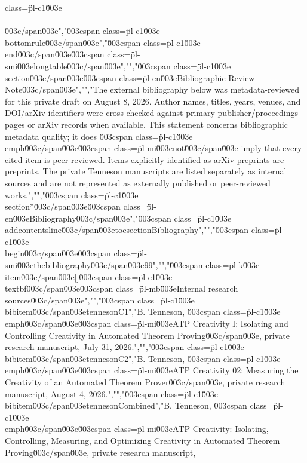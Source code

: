 {{{class=\"pl-c1\"\u003e\\\\\u003c/span\u003e","\u003cspan class=\"pl-c1\"\u003e\\bottomrule\u003c/span\u003e","\u003cspan class=\"pl-c1\"\u003e\\end\u003c/span\u003e{\u003cspan class=\"pl-smi\"\u003elongtable\u003c/span\u003e}","","\u003cspan class=\"pl-c1\"\u003e\\section\u003c/span\u003e{\u003cspan class=\"pl-en\"\u003eBibliographic Review Note\u003c/span\u003e}","","The external bibliography below was metadata-reviewed for this private draft on August 8, 2026. Author names, titles, years, venues, and DOI/arXiv identifiers were cross-checked against primary publisher/proceedings pages or arXiv records when available. This statement concerns bibliographic metadata quality; it does \u003cspan class=\"pl-c1\"\u003e\\emph\u003c/span\u003e{\u003cspan class=\"pl-mi\"\u003enot\u003c/span\u003e} imply that every cited item is peer-reviewed. Items explicitly identified as arXiv preprints are preprints. The private Tenneson manuscripts are listed separately as internal sources and are not represented as externally published or peer-reviewed works.","","\u003cspan class=\"pl-c1\"\u003e\\section*\u003c/span\u003e{\u003cspan class=\"pl-en\"\u003eBibliography\u003c/span\u003e}","\u003cspan class=\"pl-c1\"\u003e\\addcontentsline\u003c/span\u003e{toc}{section}{Bibliography}","","\u003cspan class=\"pl-c1\"\u003e\\begin\u003c/span\u003e{\u003cspan class=\"pl-smi\"\u003ethebibliography\u003c/span\u003e}{99}","","\u003cspan class=\"pl-k\"\u003e\\item\u003c/span\u003e[]\u003cspan class=\"pl-c1\"\u003e\\textbf\u003c/span\u003e{\u003cspan class=\"pl-mb\"\u003eInternal research sources\u003c/span\u003e}","","\u003cspan class=\"pl-c1\"\u003e\\bibitem\u003c/span\u003e{tennesonC1}","B. Tenneson, \u003cspan class=\"pl-c1\"\u003e\\emph\u003c/span\u003e{\u003cspan class=\"pl-mi\"\u003eATP Creativity I: Isolating and Controlling Creativity in Automated Theorem Proving\u003c/span\u003e}, private research manuscript, July 31, 2026.","","\u003cspan class=\"pl-c1\"\u003e\\bibitem\u003c/span\u003e{tennesonC2}","B. Tenneson, \u003cspan class=\"pl-c1\"\u003e\\emph\u003c/span\u003e{\u003cspan class=\"pl-mi\"\u003eATP Creativity 02: Measuring the Creativity of an Automated Theorem Prover\u003c/span\u003e}, private research manuscript, August 4, 2026.","","\u003cspan class=\"pl-c1\"\u003e\\bibitem\u003c/span\u003e{tennesonCombined}","B. Tenneson, \u003cspan class=\"pl-c1\"\u003e\\emph\u003c/span\u003e{\u003cspan class=\"pl-mi\"\u003eATP Creativity: Isolating, Controlling, Measuring, and Optimizing Creativity in Automated Theorem Proving\u003c/span\u003e}, private research manuscript, }}}
